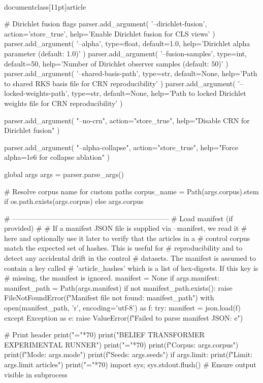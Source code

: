 \\documentclass[11pt]{article}
\begin{document}
\begin{CodeBlock}
    # Dirichlet fusion flags
    parser.add_argument(
        '--dirichlet-fusion',
        action='store_true',
        help='Enable Dirichlet fusion for CLS views'
    )
    parser.add_argument(
        '--alpha',
        type=float,
        default=1.0,
        help='Dirichlet alpha parameter (default: 1.0)'
    )
    parser.add_argument(
        '--fusion-samples',
        type=int,
        default=50,
        help='Number of Dirichlet observer samples (default: 50)'
    )
    parser.add_argument(
        '--shared-basis-path',
        type=str,
        default=None,
        help='Path to shared RKS basis file for CRN reproducibility'
    )
    parser.add_argument(
        '--locked-weights-path',
        type=str,
        default=None,
        help='Path to locked Dirichlet weights file for CRN reproducibility'
    )

    parser.add_argument(
        "--no-crn",
        action="store_true",
        help="Disable CRN for Dirichlet fusion"
    )

    parser.add_argument(
        "--alpha-collapse",
        action="store_true",
        help="Force alpha=1e6 for collapse ablation"
    )
    
    global args
    args = parser.parse_args()
    
    # Resolve corpus name for custom paths
    corpus_name = Path(args.corpus).stem if os.path.exists(args.corpus) else args.corpus


    # ------------------------------------------------------------------
    # Load manifest (if provided)
    #
    # If a manifest JSON file is supplied via --manifest, we read it
    # here and optionally use it later to verify that the articles in a
    # control corpus match the expected set of hashes. This is useful for
    # reproducibility and to detect any accidental drift in the control
    # datasets. The manifest is assumed to contain a key called
    # 'article_hashes' which is a list of hex-digests. If this key is
    # missing, the manifest is ignored.
    manifest = None
    if args.manifest:
        manifest_path = Path(args.manifest)
        if not manifest_path.exists():
            raise FileNotFoundError(f"Manifest file not found: {manifest_path}")
        with open(manifest_path, 'r', encoding='utf-8') as f:
            try:
                manifest = json.load(f)
            except Exception as e:
                raise ValueError(f"Failed to parse manifest JSON: {e}")

    
    # Print header
    print("="*70)
    print("BELIEF TRANSFORMER EXPERIMENTAL RUNNER")
    print("="*70)
    print(f"Corpus: {args.corpus}")
    print(f"Mode: {args.mode}")
    print(f"Seeds: {args.seeds}")
    if args.limit:
        print(f"Limit: {args.limit} articles")
    print("="*70)
    import sys; sys.stdout.flush()  # Ensure output visible in subprocess
    

\end{CodeBlock}
\end{document}

